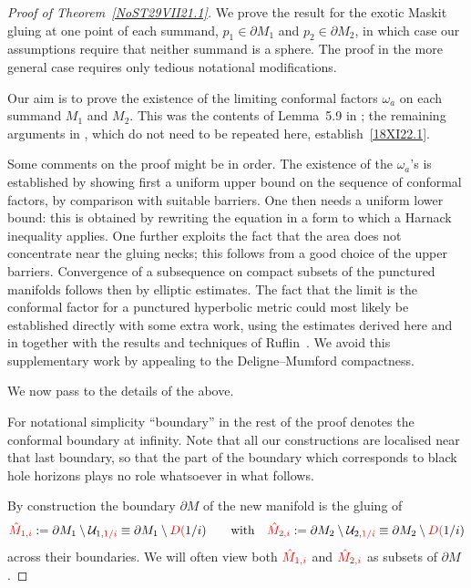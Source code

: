 \documentclass[10pt,a4paper]{article}
\numberwithin{equation}{section}
\newcommand{\mcU}{{\mycal U}}
\newcommand{\red}[1]{{\color{red}#1}}
\newcommand{\zMone}{\red{{\hat M}_{1,i}}}
\newcommand{\zMtwo}{\red{{\hat M}_{2,i}}}
\newcommand{\mycal}{\cal}%
\begin{document}
\begin{proof}[Proof of Theorem~\ref{NoST29VII21.1}]
We prove the result for the exotic Maskit gluing at one point
of each summand, {$p_1\in \partial M_1$ and $p_2 \in \partial M_2$},
in which case our assumptions require that neither summand is a sphere.
The proof in the {more} general case requires only {tedious} notational modifications.

Our aim is to prove
the existence of the limiting conformal factors $\omega_a$ on each summand $M_1$ and $M_2$. This was the contents of Lemma~5.9 in \cite{CDW}; the remaining arguments in \cite{CDW}, which do not need to be repeated here, establish~\eqref{18XI22.1}.

Some comments on the proof might be in order. The existence of the $\omega_a$'s is established by showing first a uniform upper bound on the sequence of conformal factors, by comparison with suitable barriers. One then needs a uniform lower bound: this is obtained by rewriting the equation in a form
to which a Harnack inequality applies. One further exploits the fact that the area does not
concentrate near the gluing necks; this follows from a good choice of the upper barriers. Convergence of a subsequence on compact subsets of the punctured manifolds follows then by elliptic estimates. The fact that the limit is the conformal factor for a punctured hyperbolic metric could most likely be established directly with some extra work, using the estimates derived here and in \cite{CDW} together with the results and techniques of Ruflin~\cite{Rupflin}. We avoid this supplementary work by appealing to the Deligne--Mumford compactness.

We now pass to the details of the above.

For notational simplicity ``boundary'' in the rest of the proof denotes the conformal boundary at infinity. Note that all our constructions are localised near that last boundary, so that the part of the boundary which corresponds to black hole horizons plays no role whatsoever in what follows.

By construction the boundary $\partial M$ of the new manifold is the gluing of
\[
 \zMone := \partial M_1\setminus \mcU_{1, \red{1/i}} \equiv \partial M_1\setminus \red{D(}1/i)
 \qquad
 \mbox{with}
 \quad
 \zMtwo := \partial M_2\setminus \mcU_{2, \red{1/i}}
 \equiv \partial M_2\setminus \red{D(}1/i)
\]
across their boundaries.
We will often view both
 $\zMone $ and $\zMtwo $ as subsets of $\partial M$.


\end{proof}
\end{document}
